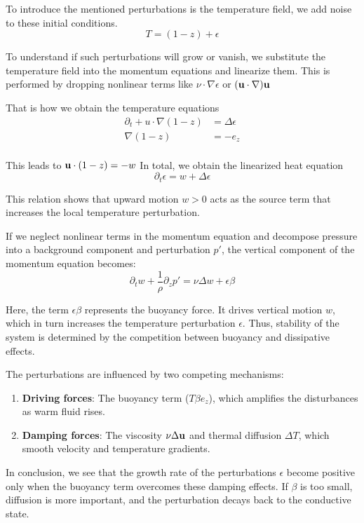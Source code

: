 To introduce the mentioned perturbations is the temperature field, we add
noise to these initial conditions.
$$T=(1-z)+ \epsilon $$

To understand if such perturbations will grow or vanish, we substitute the
temperature field into the momentum equations and linearize them. This is
performed by dropping nonlinear terms like $\nu \cdot \nabla \epsilon$ or
$(\textbf u \cdot \nabla) \textbf u$

That is how we obtain the temperature equations
\begin{align}
\partial_t + u \cdot \nabla (1-z)&=\Delta \epsilon \\
\nabla (1-z)&=-e_z \\
\end{align}

This leads to $\textbf u \cdot (1-z) = -w$
In total, we obtain the linearized heat equation
$$\partial_t \epsilon = w + \Delta \epsilon$$

This relation shows that upward motion $w>0$ acts as the source term that
increases the local temperature perturbation.

If we neglect nonlinear terms in the momentum equation and decompose
pressure into a background component and perturbation $p'$, the vertical
component of the momentum equation becomes:
$$\partial_t w + \frac{1}{\rho}\partial_z p'
= \nu \Delta w + \epsilon \beta$$

Here, the term $\epsilon \beta $ represents the buoyancy force. It drives
vertical motion $w$, which in turn increases the temperature perturbation
$\epsilon$. Thus, stability of the system is determined by the competition
between buoyancy and dissipative effects.

The perturbations are influenced by two competing mechanisms:
\begin{enumerate}
    \item{\textbf{Driving forces}: The buoyancy term ($T\beta e_z$), which
    amplifies the disturbances as warm fluid rises.}
    \item{\textbf{Damping forces}: The viscosity $\nu \Delta \textbf u$
    and thermal diffusion $\Delta T$, which smooth velocity and
    temperature gradients.}
\end{enumerate} 

In conclusion, we see that the growth rate of the perturbations $\epsilon$
become positive only when the buoyancy term overcomes these damping
effects. If $\beta $ is too small, diffusion is more important, and the
perturbation decays back to the conductive state.